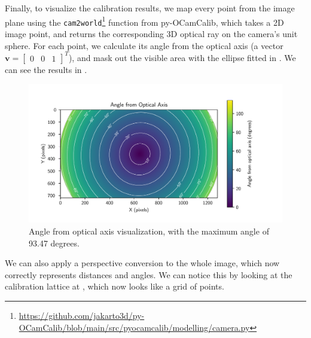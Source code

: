 Finally, to visualize the calibration results, we map every point from the image plane using the \texttt{cam2world}\footnote{\url{https://github.com/jakarto3d/py-OCamCalib/blob/main/src/pyocamcalib/modelling/camera.py}}
function from py-OCamCalib, which takes a 2D image point, and returns
the corresponding 3D optical ray on the camera's unit sphere. For each point, we calculate its angle from the optical axis (a vector $\mathbf{v} = \begin{bmatrix} 0 & 0 & 1 \end{bmatrix}^{T}$),
and mask out the visible area with the ellipse fitted in . We can see the results in .

\begin{figure}[H]
	\centering
	\includegraphics[width=1.0\textwidth]{./fig/pgfplot/evk4_viz.pdf}
	\caption{Angle from optical axis visualization, with the maximum angle of 93.47 degrees.}
	\label{fig:calibration_viz}
\end{figure}

We can also apply a perspective conversion to the whole image, which now correctly represents distances and angles. We can notice this by looking
at the calibration lattice at , which now looks like a grid of points.

